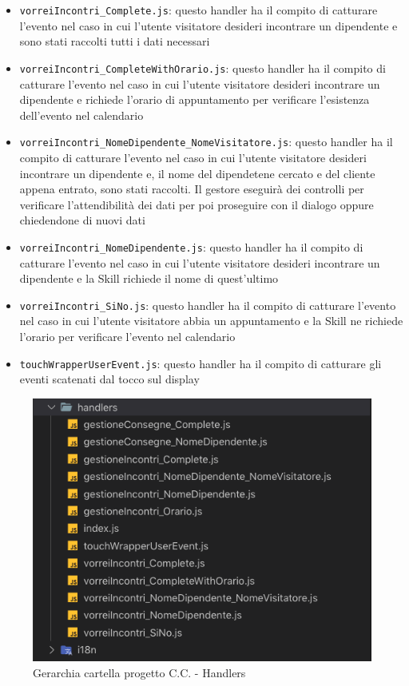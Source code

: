 \begin{itemize}
    \item \texttt{vorreiIncontri\_Complete.js}: questo handler ha il compito di catturare l'evento nel caso in cui l'utente visitatore desideri incontrare un dipendente e sono stati raccolti tutti i dati necessari 
    \item \texttt{vorreiIncontri\_CompleteWithOrario.js}: questo handler ha il compito di catturare l'evento nel caso in cui l'utente visitatore desideri incontrare un dipendente e richiede l'orario di appuntamento per verificare l'esistenza dell'evento nel calendario 
    \item \texttt{vorreiIncontri\_NomeDipendente\_NomeVisitatore.js}: questo handler ha il compito di catturare l'evento nel caso in cui l'utente visitatore desideri incontrare un dipendente e, il nome del dipendetene cercato e del cliente appena entrato, sono stati raccolti. Il gestore eseguirà dei controlli per verificare l'attendibilità dei dati per poi proseguire con il dialogo oppure chiedendone di nuovi dati
    \item \texttt{vorreiIncontri\_NomeDipendente.js}: questo handler ha il compito di catturare l'evento nel caso in cui l'utente visitatore desideri incontrare un dipendente e la Skill richiede il nome di quest'ultimo
    \item \texttt{vorreiIncontri\_SiNo.js}: questo handler ha il compito di catturare l'evento nel caso in cui l'utente visitatore abbia un appuntamento e la Skill ne richiede l'orario per verificare l'evento nel calendario
    \item \texttt{touchWrapperUserEvent.js}: questo handler ha il compito di catturare gli eventi scatenati dal tocco sul display 
\end{itemize}
\begin{figure}[H]
	\includegraphics[width=13cm]{immagini/skill-folder2.png}
	\caption{\label{fig:gerarchia_cartella_cc2}Gerarchia cartella progetto C.C. - Handlers}
\end{figure}
